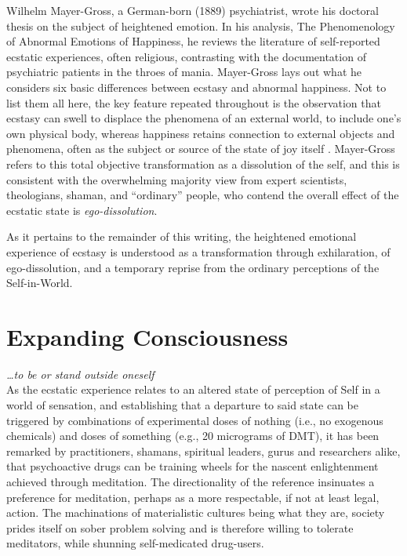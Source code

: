 \documentclass{UIdahoMastersThesis}
\begin{document}
Wilhelm Mayer-Gross, a German-born (1889) psychiatrist, wrote his doctoral thesis on the subject of heightened emotion. In his analysis, The Phenomenology of Abnormal Emotions of Happiness, he reviews the literature of self-reported ecstatic experiences, often religious, contrasting with the documentation of psychiatric patients in the throes of mania\cite{mayer-gross_translation:_nodate}.  Mayer-Gross lays out what he considers six basic differences between ecstasy and abnormal happiness. Not to list them all here, the key feature repeated throughout is the observation that ecstasy can swell to displace the phenomena of an external world, to include one's own physical body, whereas happiness retains connection to external objects and phenomena, often as the subject or source of the state of joy itself \cite{beer_nature_2000} . Mayer-Gross refers to this total objective transformation as a dissolution of the self, and this is consistent with the overwhelming majority view from expert scientists, theologians, shaman, and ``ordinary'' people, who contend the overall effect of the ecstatic state is \emph{ego-dissolution}.

As it pertains to the remainder of this writing, the heightened emotional experience of ecstasy is understood as a transformation through exhilaration, of ego-dissolution, and a temporary reprise from the ordinary perceptions of the Self-in-World.

\clearpage
\chapter{Expanding Consciousness}
\label{Chapter:Expanding Consciousness}

\emph{\ldots to be or stand outside oneself}\\

As the ecstatic experience relates to an altered state of perception of Self in a world of sensation, and establishing that a departure to said state can be triggered by combinations of experimental doses of nothing (i.e., no exogenous chemicals) and doses of something (e.g., 20 micrograms of DMT), it has been remarked by practitioners, shamans, spiritual leaders, gurus and researchers alike, that psychoactive drugs can be training wheels for the nascent enlightenment achieved through meditation. The directionality of the reference insinuates a preference for meditation, perhaps as a more respectable, if not at least legal, action. The machinations of materialistic cultures being what they are, society prides itself on sober problem solving and is therefore willing to tolerate meditators, while shunning self-medicated drug-users.
\end{document}
